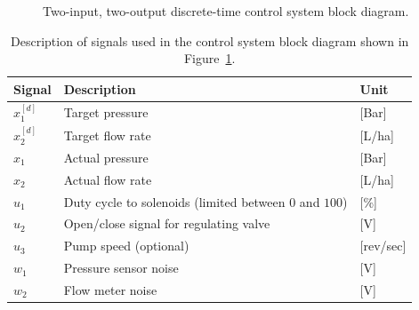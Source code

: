 \begin{figure}
  \caption[Two-input, two-output discrete-time control system block diagram.]{Two-input, two-output discrete-time control system block diagram.}
  \label{fig:twoInputTwoOutputDT-ControlSystem}
\end{figure}
%
\begin{table}
  \centering
  \caption{Description of signals used in the control system block diagram shown in Figure~\ref{fig:twoInputTwoOutputDT-ControlSystem}.}
  \label{tab:signalDescription}
  \begin{tabular}{lll}
    \toprule[1.5pt]
    Signal& Description& Unit\\
    \toprule
    $x_1^{[d]}$ & Target pressure & [Bar]\\
    $x_2^{[d]}$ & Target flow rate& [L/ha]\\
    $x_1$ & Actual pressure & [Bar]\\
    $x_2$ & Actual flow rate& [L/ha]\\
    $u_1$ & Duty cycle to solenoids (limited between $0$ and $100$)& [\%]\\
    $u_2$ & Open/close signal for regulating valve& [V]\\
    $u_3$ & Pump speed (optional)& [rev/sec]\\
    $w_1$ & Pressure sensor noise& [V]\\
    $w_2$ & Flow meter noise& [V]\\
    \bottomrule[1.5pt]
  \end{tabular}
\end{table}
